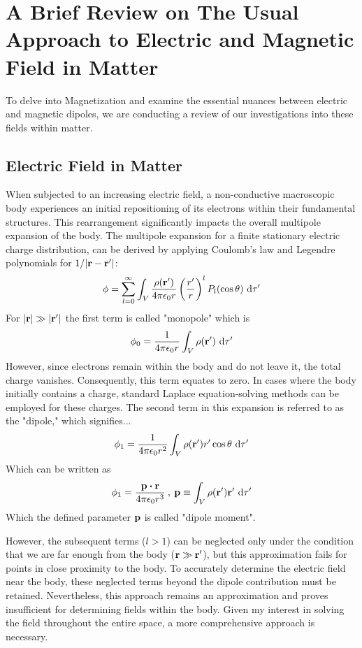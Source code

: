 \documentclass{article}
\numberwithin{equation}{section}
\begin{document}
\section{A Brief Review on The Usual Approach to Electric and Magnetic Field in Matter}
To delve into Magnetization and examine the essential nuances between electric and magnetic dipoles, we are conducting a review of our investigations into these fields within matter.
\subsection{Electric Field in Matter}
When subjected to an increasing electric field, a non-conductive macroscopic body experiences an initial repositioning of its electrons within their fundamental structures. This rearrangement significantly impacts the overall multipole expansion of the body. The multipole expansion for a finite stationary electric charge distribution, can be derived by applying Coulomb's law and Legendre polynomials for $1/|\vb{r}-\vb{r'}|$:
%
\begin{equation}
    \phi=\sum_{l=0}^\infty \int_V \frac{\rho(\vb{r'})}{4\pi\epsilon_0 r}\left(\frac{r'}{r}\right)^l P_l(\cos\theta)\ \dd\tau'    \label{eqn:eq1}
\end{equation}
%
For $|\vb{r}|\gg|\vb{r'}|$ the first term is called "monopole" which is
%
\begin{equation}
    \phi_0=\frac{1}{4\pi\epsilon_0 r} \int_V \rho(\vb{r'})\ \dd\tau'    \label{eqn:eq2}
\end{equation}
%
However, since electrons remain within the body and do not leave it, the total charge vanishes. Consequently, this term equates to zero. In cases where the body initially contains a charge, standard Laplace equation-solving methods can be employed for these charges. The second term in this expansion is referred to as the "dipole," which signifies...
%
\begin{equation}
    \phi_1=\frac{1}{4\pi\epsilon_0 r^2} \int_V \rho(\vb{r'})r' \cos\theta \ \dd\tau'    \label{eqn:eq3}
\end{equation}
Which can be written as
%
\begin{gather}
\phi_1=\frac{\vb{p}\vdot\vb{r}}{4\pi\epsilon_0 r^3}\:,\:\vb{p}\equiv\int_V \rho(\vb{r'})\vb{r'} \ \dd\tau'\label{eqn:eq4}
\end{gather}
%
Which the defined parameter $\vb{p}$ is called "dipole moment".
\par
However, the subsequent terms ($l>1$) can be neglected only under the condition that we are far enough from the body ($\vb{r}\gg \vb{r'}$), but this approximation fails for points in close proximity to the body. To accurately determine the electric field near the body, these neglected terms beyond the dipole contribution must be retained. Nevertheless, this approach remains an approximation and proves insufficient for determining fields within the body. Given my interest in solving the field throughout the entire space, a more comprehensive approach is necessary.
\end{document}
